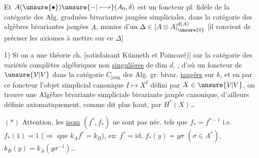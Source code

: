 Et $A(\unsure{\bullet})\unsure{\mathbin{-}|\longmapsto}(A_0,\delta)$ est un foncteur pl. fidèle de la catégorie des Alg. graduées bivariantes jaugées simpliciales, dans la catégorie des algèbres  bivariantes jaugées $A$, munies d'un $\Delta\in[A\otimes A]^{d(A)}_{\unsure{0}}$ [il convient de préciser les axiomes à mettre sur ce $\Delta$]

 1) Si on a une théorie ch.  [satisfaisant Künneth et Poincaré)] sur la catégorie  des variétés complètes algébriques non \uline{singulières} de dim $d$,  , d'où un foncteur  de $\unsure{\mathcal V|V}$ dans la catégorie $C_{\mathrm{jaug}}$ des Alg. gr. bivar. \uline{jaugées} sur $k$, et en  par ce foncteur l'objet simplicial canonique $I\longmapsto X^I$ défini par $X\in\unsure{\mathcal V|V}$, on trouve une Algèbre bivariante simpliciale bivariante jaugée canonique, d'ailleurs définie axiomatiquement, comme dit plus haut, par  $H^*(X)$\ldots
{}

$(*)$ Attention, les \uline{isom} $(f^*,f_*)$ ne sont pas néc. tels que $f_*=f^{*-1}$ i.e. $f_*(1)=1$ ($\Rightarrow$  que $k_Af^*=k_B$), ex: $f^*=\mathrm{id}$, $f_*(y)=y\sigma$ $(\sigma\in A^*)$, $k_B(y)=k_A(y\sigma^{-1})$\ldots
